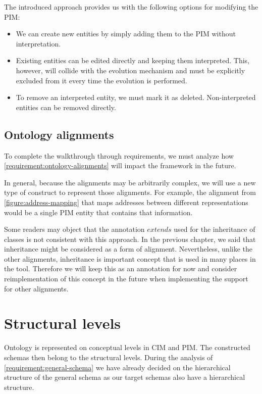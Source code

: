 \medskip

The introduced approach provides us with the following options for modifying the PIM:
\begin{itemize}
    \item We can create new entities by simply adding them to the PIM without interpretation.
    \item Existing entities can be edited directly and keeping them interpreted. This, however, will collide with the evolution mechanism and must be explicitly excluded from it every time the evolution is performed.
    \item To remove an interpreted entity, we must mark it as deleted. Non-in\-ter\-pre\-ted entities can be removed directly.
\end{itemize}

\subsection{Ontology alignments}\label{sec:ontology-alignments}

To complete the walkthrough through requirements, we must analyze how \autoref{requirement:ontology-alignments} will impact the framework in the future.

In general, because the alignments may be arbitrarily complex, we will use a new type of construct to represent those alignments. For example, the alignment from \autoref{figure:address-mapping} that maps addresses between different representations would be a single PIM entity that contains that information.

Some readers may object that the annotation $extends$ used for the inheritance of classes is not consistent with this approach. In the previous chapter, we said that inheritance might be considered as a form of alignment. Nevertheless, unlike the other alignments, inheritance is important concept that is used in many places in the tool. Therefore we will keep this as an annotation for now and consider reimplementation of this concept in the future when implementing the support for other alignments.


\section{Structural levels}

Ontology is represented on conceptual levels in CIM and PIM. The constructed schemas then belong to the structural levels. During the analysis of \autoref{requirement:general-schema} we have already decided on the hierarchical structure of the general schema as our target schemas also have a hierarchical structure.


